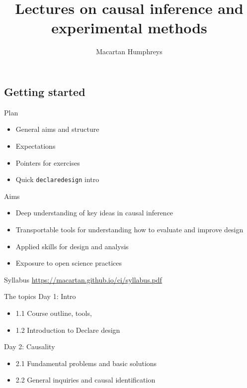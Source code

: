 \documentclass[
  11pt,
  ignorenonframetext,
]{beamer}
\title{Lectures on causal inference and experimental methods}
\author{Macartan Humphreys}
\date{}
\providecommand{\tightlist}{%
  \setlength{\itemsep}{0pt}\setlength{\parskip}{0pt}}\usepackage{longtable,booktabs,array}
\begin{document}
\frame{\titlepage}
\ifdefined\Shaded\renewenvironment{Shaded}{\begin{tcolorbox}[borderline west={3pt}{0pt}{shadecolor}, frame hidden, sharp corners, breakable, enhanced, boxrule=0pt, interior hidden]}{\end{tcolorbox}}\fi

\hypertarget{getting-started}{%
\subsection{Getting started}\label{getting-started}}

\begin{frame}[fragile]{Plan}
\protect\hypertarget{plan}{}
\begin{itemize}
\tightlist
\item
  General aims and structure
\item
  Expectations
\item
  Pointers for exercises
\item
  Quick \texttt{declaredesign} intro
\end{itemize}
\end{frame}

\begin{frame}{Aims}
\protect\hypertarget{aims}{}
\begin{itemize}
\tightlist
\item
  Deep understanding of key ideas in causal inference
\item
  Transportable tools for understanding how to evaluate and improve
  design
\item
  Applied skills for design and analysis
\item
  Exposure to open science practices
\end{itemize}
\end{frame}

\begin{frame}{Syllabus}
\protect\hypertarget{syllabus}{}
\url{https://macartan.github.io/ci/syllabus.pdf}
\end{frame}

\begin{frame}{The topics}
\protect\hypertarget{the-topics}{}
Day 1: Intro

\begin{itemize}
\tightlist
\item
  1.1 Course outline, tools,
\item
  1.2 Introduction to Declare design
\end{itemize}

Day 2: Causality

\begin{itemize}
\tightlist
\item
  2.1 Fundamental problems and basic solutions
\item
  2.2 General inquiries and causal identification
\end{itemize}
\end{frame}
\end{document}
